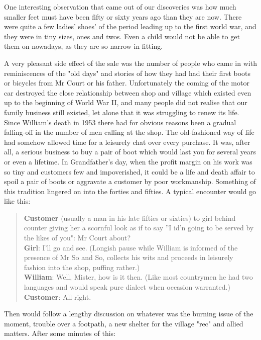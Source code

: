 One interesting observation that came out of our discoveries was how much smaller feet must have been fifty or sixty years ago than they are now. There were quite a few ladies' shoes' of the period leading up to the first world war, and they were in tiny sizes, ones and twos. Even a child would not be able to get them on nowadays, as they are so narrow in fitting.

A very pleasant side effect of the sale was the number of people who came in with reminiscences of the "old days" and stories of how they had had their first boots or bicycles from Mr Court or his father. Unfortunately the coming of the motor car destroyed the close relationship between shop and village which existed even up to the beginning of World War II, and many people did not realise that our family business still existed, let alone that it was struggling to renew its life. Since William's death in 1953 there had for obvious reasons been a gradual falling-off in the number of men calling at the shop. The old-fashioned way of life had somehow allowed time for a leisurely chat over every purchase. It was, after all, a serious business to buy a pair of boot which would last you for several years or even a lifetime. In Grandfather's day, when the profit margin on his work was so tiny and customers few and impoverished, it could be a life and death affair to spoil a pair of boots or aggravate a customer by poor workmanship. Something of this tradition lingered on into the forties and fifties. A typical encounter would go like this:

\begin{quote}
\textbf{Customer} (usually a man in his late fifties or sixties) to girl behind counter giving her a scornful look as if to say ”I id'n going to be served by the likes of you": Mr Court about? \\
\textbf{Girl}: I'll go and see. (Longish pause while William is informed of the presence of Mr So and So, collects his wits and proceeds in leisurely fashion into the shop, puffing rather.) \\
\textbf{William}: Well, Mister, how is it then. (Like most countrymen he had two languages and would speak pure dialect when occasion warranted.) \\
\textbf{Customer}: All right.
\end{quote}

Then would follow a lengthy discussion on whatever was the burning issue of the moment, trouble over a footpath, a new shelter for the village "rec" and allied matters. After some minutes of this:

